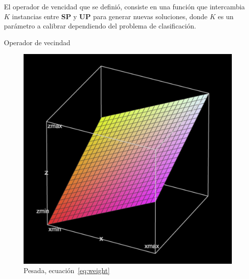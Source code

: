 \documentclass{ci5652}
\begin{document}
El operador de vencidad que se definió, consiste en una función que intercambia $K$ instancias entre \textbf{SP} y \textbf{UP} para generar nuevas soluciones, donde $K$ es un parámetro a calibrar dependiendo del problema de clasificación.

\begin{algorithm}
 \DontPrintSemicolon
 \vspace*{0.1cm}
 \vspace*{0.1cm}
 \caption{Operador de vecindad}
\end{algorithm}

\begin{figure}[p]
	\includegraphics[width=\linewidth]{weighted-3b}
	\caption{Pesada, ecuación~\ref{eq:weight}}
	\label{fig:weighted3}
\end{figure}
\end{document}
